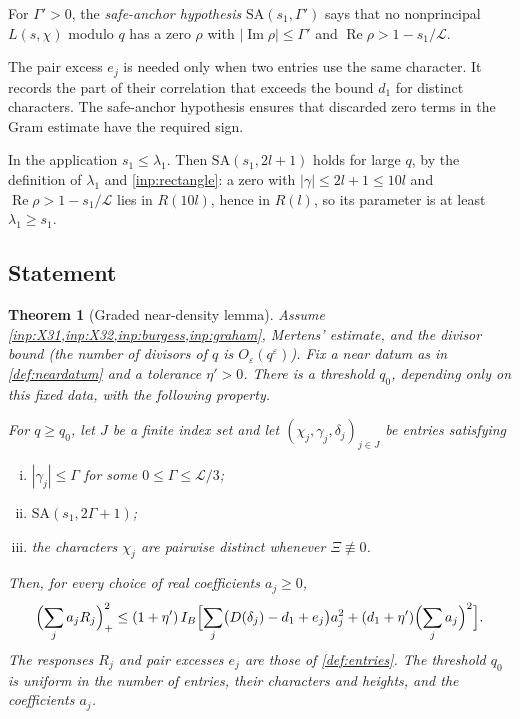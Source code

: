 \documentclass[11pt]{amsart}
\numberwithin{equation}{section}
\theoremstyle{plain}
\newtheorem{theorem}{Theorem}[section]
\theoremstyle{definition}
\theoremstyle{remark}
\newcommand{\LL}{\mathcal{L}}
\renewcommand{\Re}{\operatorname{Re}}
\renewcommand{\Im}{\operatorname{Im}}
\newcommand{\eps}{\varepsilon}
\newcommand{\1}{\mathbf{1}}
\begin{document}
\begin{definition}\label{def:safeanchor}
For $\Gamma'>0$, the \emph{safe-anchor hypothesis} $\mathrm{SA}(s_1,\Gamma')$ says that no nonprincipal
$L(s,\chi)$ modulo $q$ has a zero $\rho$ with $|\Im\rho|\le\Gamma'$ and $\Re\rho>1-s_1/\LL$.
\end{definition}

The pair excess $e_j$ is needed only when two entries use the same character. It records
the part of their correlation that exceeds the bound $d_1$ for distinct characters.
The safe-anchor hypothesis ensures that discarded zero terms in the Gram estimate have
the required sign.

In the application $s_1\le\lambda_1$. Then $\mathrm{SA}(s_1,2l+1)$ holds for large $q$, by the
definition of $\lambda_1$ and \cref{inp:rectangle}: a zero with $|\gamma|\le2l+1\le10l$ and
$\Re\rho>1-s_1/\LL$ lies in $R(10l)$, hence in $R(l)$, so its parameter is at least
$\lambda_1\ge s_1$.

\subsection{Statement}

\begin{theorem}[Graded near-density lemma]\label{thm:graded}
Assume \cref{inp:X31,inp:X32,inp:burgess,inp:graham}, Mertens' estimate, and the divisor
bound (the number of divisors of $q$ is $O_\eps(q^\eps)$). Fix a near datum as in \cref{def:neardatum} and a
tolerance $\eta'>0$. There is a threshold $q_0$, depending only on this fixed data, with
the following property.

For $q\ge q_0$, let $J$ be a finite index set and let
$(\chi_j,\gamma_j,\delta_j)_{j\in J}$ be entries satisfying
\begin{enumerate}[(i)]
  \item $|\gamma_j|\le\Gamma$ for some $0\le\Gamma\le\LL/3$;
  \item $\mathrm{SA}(s_1,2\Gamma+1)$;
  \item the characters $\chi_j$ are pairwise distinct whenever $\Xi\not\equiv0$.
\end{enumerate}
Then, for every choice of real coefficients $a_j\ge0$,
\[
  \Bigl(\sum_ja_jR_j\Bigr)_+^2\le(1+\eta')\,I_B\Bigl[\sum_j\bigl(D(\delta_j)-d_1+e_j\bigr)a_j^2
  +(d_1+\eta')\Bigl(\sum_ja_j\Bigr)^2\Bigr].
\]
The responses $R_j$ and pair excesses $e_j$ are those of \cref{def:entries}.
The threshold $q_0$ is uniform in the number of entries, their characters and heights,
and the coefficients $a_j$.
\end{theorem}
\end{document}
